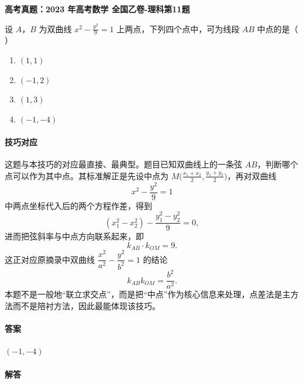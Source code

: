 \documentclass[UTF8,a4paper,11pt]{ctexart}
\newenvironment{gaokao}[1]{\par\medskip\noindent\textbf{高考真题：#1}\par\smallskip}{\par\medskip}
\begin{document}
\begin{gaokao}{2023 年高考数学 全国乙卷-理科第11题}

设 $A$，$B$ 为双曲线 $x^2-\frac{y^2}{9}=1$ 上两点，下列四个点中，可为线段 $AB$ 中点的是（ ）

\begin{enumerate}[label=\Alph*. ,itemsep=2pt]

\item $(1,1)$

\item $(-1,2)$

\item $(1,3)$

\item $(-1,-4)$

\end{enumerate}

\paragraph{技巧对应}

这题与本技巧的对应最直接、最典型。题目已知双曲线上的一条弦 $AB$，判断哪个点可以作为其中点。其标准解正是先设中点为 $M\bigl(\frac{x_1+x_2}{2},\frac{y_1+y_2}{2}\bigr)$，再对双曲线
\[
x^2-\frac{y^2}{9}=1
\]
中两点坐标代入后的两个方程作差，得到
\[
(x_1^2-x_2^2)-\frac{y_1^2-y_2^2}{9}=0,
\]
进而把弦斜率与中点方向联系起来，即
\[
k_{AB}\cdot k_{OM}=9.
\]
这正对应原摘录中双曲线 $\dfrac{x^2}{a^2}-\dfrac{y^2}{b^2}=1$ 的结论
\[
k_{AB}k_{OM}=\frac{b^2}{a^2}.
\]
本题不是一般地“联立求交点”，而是把“中点”作为核心信息来处理，点差法是主方法而不是陪衬方法，因此最能体现该技巧。

\paragraph{答案}

$(-1,-4)$

\paragraph{解答}


\end{gaokao}
\end{document}
